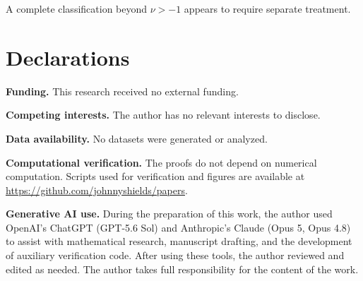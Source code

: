 \documentclass[11pt,a4paper]{amsart}
\numberwithin{equation}{section}
\theoremstyle{plain}
\theoremstyle{definition}
\begin{document}
A complete classification beyond \(\nu>-1\) appears to require separate
treatment.

\section*{Declarations}
{\footnotesize

\noindent\textbf{Funding.} This research received no external funding.

\smallskip
\noindent\textbf{Competing interests.} The author has no relevant interests to disclose.

\smallskip
\noindent\textbf{Data availability.} No datasets were generated or analyzed.

\smallskip
\noindent\textbf{Computational verification.} The proofs do not depend on numerical computation.  Scripts used for verification and figures are available at \url{https://github.com/johnnyshields/papers}.

\smallskip
\noindent\textbf{Generative AI use.} During the preparation of this work, the author used OpenAI's ChatGPT (GPT-5.6 Sol) and Anthropic's Claude (Opus 5, Opus 4.8) to assist with mathematical research, manuscript drafting, and the development of auxiliary verification code.  After using these tools, the author reviewed and edited as needed.  The author takes full responsibility for the content of the work.\par}
\end{document}

